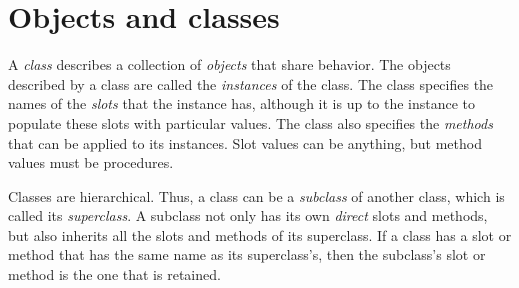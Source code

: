 \chapter{Objects and classes}

A {\em class} describes a collection of {\em objects}
that share behavior.  The objects described by a class
are called the {\em instances} of the class.  The class
specifies the names of the {\em slots} that the
instance has, although it is up to the instance to
populate these slots with particular values.
The class also specifies the {\em methods} that can be
applied to its instances.  Slot values can be anything,
but method values must be procedures.  


Classes are hierarchical.  Thus, a class can be a {\em
subclass} of another class, which is called its {\em
superclass}.  A subclass not only has its own {\em
direct} slots and methods, but also inherits all the
slots and methods of its superclass.  If a class has a
slot or method that has the same name as its
superclass's, then the subclass's slot or method is the
one that is retained.







